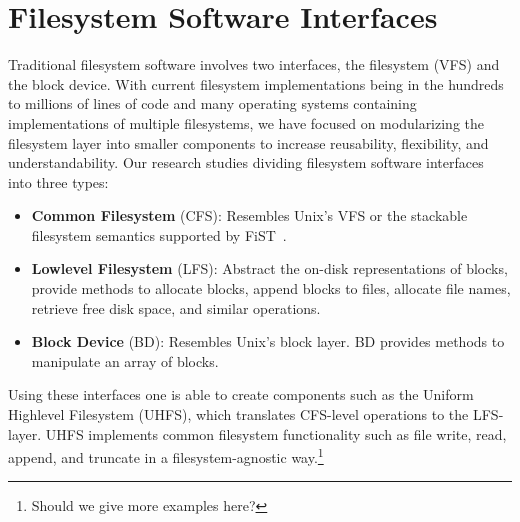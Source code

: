 \section{Filesystem Software Interfaces}

Traditional filesystem software involves two interfaces, the
filesystem (VFS) and the block device. With current filesystem
implementations being in the hundreds to millions of lines of code and
many operating systems containing implementations of multiple
filesystems, we have focused on modularizing the filesystem layer into
smaller components to increase reusability, flexibility, and
understandability. Our research studies dividing filesystem software
interfaces into three types:

\begin{itemize}
\item \textbf{Common Filesystem} (CFS): Resembles Unix's VFS or the
  stackable filesystem semantics supported by FiST~\cite{fist}.
\item \textbf{Lowlevel Filesystem} (LFS): Abstract the on-disk
  representations of blocks, provide methods to allocate blocks,
  append blocks to files, allocate file names, retrieve free disk
  space, and similar operations.
\item \textbf{Block Device} (BD): Resembles Unix's block layer. BD
  provides methods to manipulate an array of blocks.
\end{itemize}

Using these interfaces one is able to create components such as the
Uniform Highlevel Filesystem (UHFS), which translates CFS-level
operations to the LFS-layer. UHFS implements common filesystem
functionality such as file write, read, append, and truncate in a
filesystem-agnostic way.\footnote{Should we give more examples here?}
